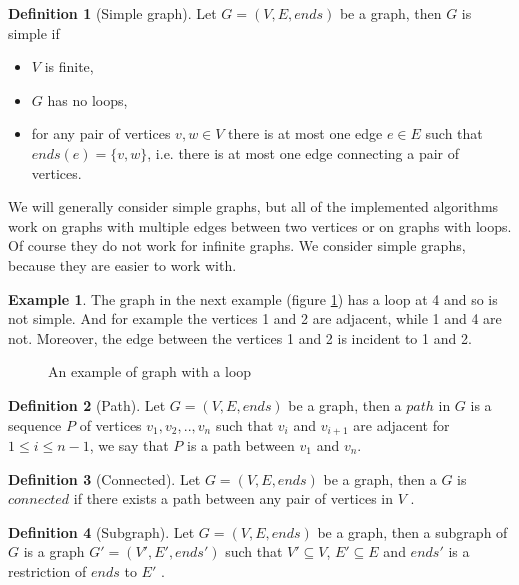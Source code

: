 \documentclass{report}
\theoremstyle{plain}
\theoremstyle{definition}
\newtheorem{definition}{Definition}
\newtheorem{example}{Example}
\theoremstyle{remark}
\numberwithin{definition}{chapter}
\numberwithin{example}{chapter}
\numberwithin{figure}{chapter}
\numberwithin{theorem}{chapter}
\numberwithin{lemma}{chapter}
\begin{document}
\begin{definition}[Simple graph]
Let $G = (V, E, ends)$ be a graph, then $G$ is simple if
\begin{itemize}
\item $V$ is finite,
\item $G$ has no loops,
\item for any pair of vertices $v,w \in V$ there is at most one edge $e \in E$ such that $ends(e) = \{v, w\}$, i.e. there is at most one edge connecting a pair of vertices.
\end{itemize}
\end{definition}

We will generally consider simple graphs, but all of the implemented algorithms work on graphs with multiple edges between two vertices or on graphs with loops. Of course they do not work for infinite graphs. We consider simple graphs, because they are easier to work with.

\begin{example}
The graph in the next example (figure \ref{loop}) has a loop at 4 and so is not simple. And for example the vertices 1 and 2 are adjacent, while 1 and 4 are not. Moreover, the edge between the vertices 1 and 2 is incident to 1 and 2.
\begin{figure}[h]
\center
{}
\caption{An example of graph with a loop}
\label{loop}
\end{figure}
\end{example}

\begin{definition}[Path]
Let $G = (V, E, ends)$ be a graph, then a $path$ in $G$ is a sequence $P$ of vertices $v_1,v_2,..,v_n$ such that $v_i$ and $v_{i+1}$ are adjacent for $1 \leq i \leq n - 1$, we say that $P$ is a path between $v_1$ and $v_n$.
\end{definition}

\begin{definition}[Connected]
Let $G = (V, E, ends)$ be a graph, then a $G$ is $connected$ if there exists a path between any pair of vertices in $V$ \cite{bollobas1998modern}.
\end{definition}

\begin{definition}[Subgraph]
Let $G = (V, E, ends)$ be a graph, then a subgraph of $G$ is a graph $G'=(V', E', ends')$ such that $V' \subseteq V$, $E' \subseteq E$ and $ends'$ is a restriction of $ends$ to $E'$ \cite{bondy2008graph}.
\end{definition}
\end{document}
